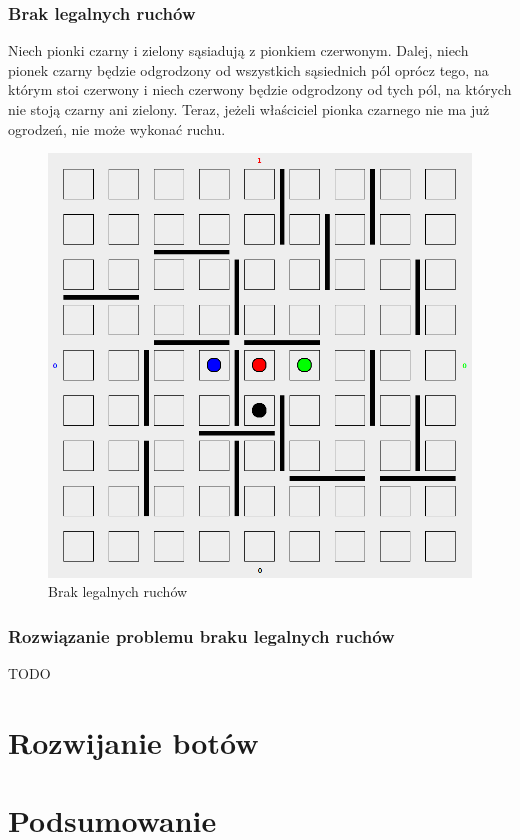 \documentclass{pracamgr}
\begin{document}
\subsection*{Brak legalnych ruchów}

Niech pionki czarny i zielony sąsiadują z pionkiem czerwonym. Dalej, niech pionek czarny będzie odgrodzony od wszystkich sąsiednich pól oprócz tego, na którym stoi czerwony i niech czerwony będzie odgrodzony od tych pól, na których nie stoją czarny ani zielony. Teraz, jeżeli właściciel pionka czarnego nie ma już ogrodzeń, nie może wykonać ruchu.

\begin{figure}[ht!]
\centering
\includegraphics[width=120mm]{img/no-move.png}
\caption{Brak legalnych ruchów \label{overflow}}
\end{figure}

\subsection*{Rozwiązanie problemu braku legalnych ruchów}

TODO

\chapter{Rozwijanie botów}

\chapter{Podsumowanie}

\begin{thebibliography}{99}
\end{thebibliography}
\end{document}
